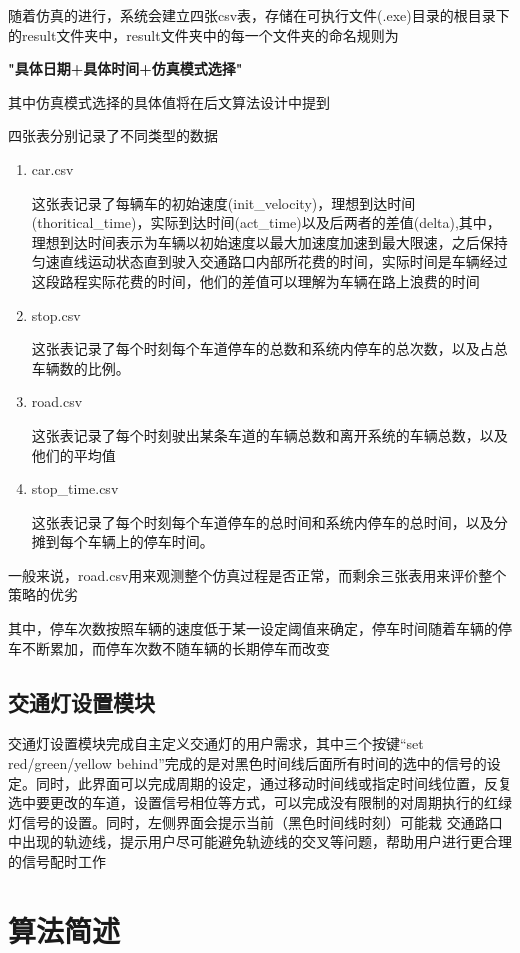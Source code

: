 \documentclass[UTF8,a4paper]{ctexart}
\begin{document}
随着仿真的进行，系统会建立四张csv表，存储在可执行文件(.exe)目录的根目录下的result文件夹中，result文件夹中的每一个文件夹的命名规则为

\centerline{\textbf{"具体日期+具体时间+仿真模式选择"}}

其中仿真模式选择的具体值将在后文算法设计中提到

四张表分别记录了不同类型的数据
\begin{enumerate}
\item car.csv

这张表记录了每辆车的初始速度(init\_velocity)，理想到达时间(thoritical\_time)，实际到达时间(act\_time)以及后两者的差值(delta),其中，理想到达时间表示为车辆以初始速度以最大加速度加速到最大限速，之后保持匀速直线运动状态直到驶入交通路口内部所花费的时间，实际时间是车辆经过这段路程实际花费的时间，他们的差值可以理解为车辆在路上浪费的时间
\item stop.csv

这张表记录了每个时刻每个车道停车的总数和系统内停车的总次数，以及占总车辆数的比例。

\item road.csv

这张表记录了每个时刻驶出某条车道的车辆总数和离开系统的车辆总数，以及他们的平均值
\item stop\_time.csv

这张表记录了每个时刻每个车道停车的总时间和系统内停车的总时间，以及分摊到每个车辆上的停车时间。
\end{enumerate}

一般来说，road.csv用来观测整个仿真过程是否正常，而剩余三张表用来评价整个策略的优劣

其中，停车次数按照车辆的速度低于某一设定阈值来确定，停车时间随着车辆的停车不断累加，而停车次数不随车辆的长期停车而改变

\subsection{交通灯设置模块}

交通灯设置模块完成自主定义交通灯的用户需求，其中三个按键“set red/green/yellow behind”完成的是对黑色时间线后面所有时间的选中的信号的设定。同时，此界面可以完成周期的设定，通过移动时间线或指定时间线位置，反复选中要更改的车道，设置信号相位等方式，可以完成没有限制的对周期执行的红绿灯信号的设置。同时，左侧界面会提示当前（黑色时间线时刻）可能栽 交通路口中出现的轨迹线，提示用户尽可能避免轨迹线的交叉等问题，帮助用户进行更合理的信号配时工作
\section{算法简述}
\end{document}
